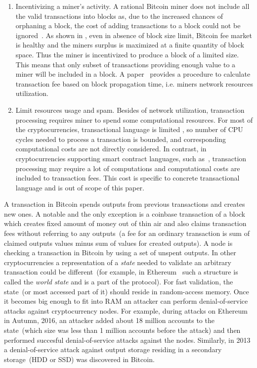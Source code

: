 \documentclass[]{llncs}   %
\begin{document}
\begin{enumerate}
  \item{Incentivizing a miner's activity. } A rational Bitcoin miner does not include all the valid transactions into blocks as, due to the increased chances of orphaning a block, the cost of adding transactions to a block could not be ignored~\cite{rizun2015transaction, andresen2013}. As shown in \cite{rizun2015transaction}, even in absence of block size limit, Bitcoin fee market is healthy and the miners surplus is maximized at a finite quantity of block space. Thus the miner is incentivized to produce a block of a limited size. This means that only subset of transactions providing enough value to a miner will be included in a block. A paper~\cite{rizun2015transaction} provides a procedure to calculate transaction fee based on block propagation time, i.e. miners network resources utilization. 


  \item{Limit resources usage and spam. } Besides of network utilization, transaction processing requires miner to spend some computational resources. For most of the cryptocurrencies, transactional language is limited \cite{script}, so number of CPU cycles needed to process a transaction is bounded, and corresponding computational costs are not directly considered. In contrast, in cryptocurrencies supporting  smart contract languages, such as~\cite{seijas2016scripting, tezosScript, solidity}, transaction processing may require a lot of computations and computational costs are included to transaction fees. This cost is specific to concrete transactional language and is out of scope of this paper.
\end{enumerate}

A transaction in Bitcoin spends outputs from previous transactions and creates new ones. A notable and the only exception is a coinbase transaction of a block which creates fixed amount of money out of thin air and also claims transaction fees without referring to any outputs~(a fee for an ordinary transaction is sum of claimed outputs values minus sum of values for created outputs). A node is checking a transaction in Bitcoin by using a set of unspent outputs. In other cryptocurrencies a representation of a \textit{state} needed to validate an arbitrary transaction could be different~(for example, in Ethereum~\cite{ethyp} such a structure is called the \textit{world state} and is a part of the protocol).  For fast validation, the state~(or most accessed part of it) should reside in random-access memory. Once it becomes big enough to fit into RAM an attacker can perform denial-of-service attacks against cryptocurrency nodes. For example, during attacks on Ethereum in Autumn, 2016, an attacker added about 18 million accounts to the state~(which size was less than 1 million accounts before the attack) and then performed succesful denial-of-service attacks against the nodes. Similarly, in 2013 a denial-of-service attack against output storage residing in a secondary storage~(HDD or SSD) was discovered in Bitcoin. 
\end{document}
